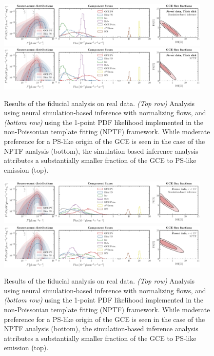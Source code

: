 \documentclass[prd,aps,10pt,nofootinbib,twocolumn,superscriptaddress,preprintnumbers,balancelastpage,longbibliography]{revtex4-1}
\begin{document}
%
\begin{figure}
    \centering
    \includegraphics[width=0.95\textwidth]{plots/data_fid_sbi_thick.pdf}
    \includegraphics[width=0.95\textwidth]{plots/data_fid_nptf_thick.pdf}
    \caption{Results of the fiducial analysis on real \Fermi data. \emph{(Top row)} Analysis using neural simulation-based inference with normalizing flows, and \emph{(bottom row)} using the 1-point PDF likelihood implemented in the non-Poissonian template fitting (NPTF) framework. While moderate preference for a PS-like origin of the GCE is seen in the case of the NPTF analysis (bottom), the simulation-based inference analysis attributes a substantially smaller fraction of the GCE to PS-like emission (top).}
    \label{fig:fid_data_thick_disk}
\end{figure}
%


%
\begin{figure}
    \centering
    \includegraphics[width=0.95\textwidth]{plots/data_fid_sbi_15deg.pdf}
    \includegraphics[width=0.95\textwidth]{plots/data_fid_nptf_15deg.pdf}
    \caption{Results of the fiducial analysis on real \Fermi data. \emph{(Top row)} Analysis using neural simulation-based inference with normalizing flows, and \emph{(bottom row)} using the 1-point PDF likelihood implemented in the non-Poissonian template fitting (NPTF) framework. While moderate preference for a PS-like origin of the GCE is seen in the case of the NPTF analysis (bottom), the simulation-based inference analysis attributes a substantially smaller fraction of the GCE to PS-like emission (top).}
    \label{fig:fid_data_15deg}
\end{figure}
%
\end{document}

